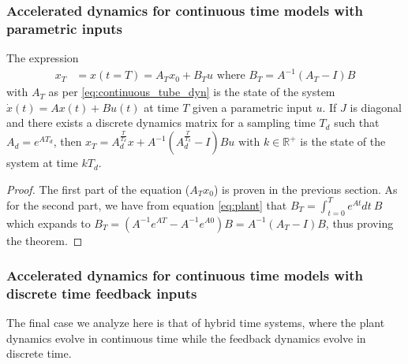 \documentclass[a4paper,UKenglish]{lipics-v2018}
\newcommand{\mat}[1]{{#1}}
\renewcommand{\vec}[1]{{#1}}
\begin{document}
 \subsubsection{Accelerated dynamics for continuous time models with parametric inputs}\label{sec:cont_acc_param_inputs}
\begin{lemma}
The expression
 \begin{align}
 \vec{x}_T&=\vec{x}(t=T)=\mat{A}_T\vec{x}_0 + \mat{B}_T\vec{u} \text{ where } \mat{B}_T=\mat{A}^{-1}(\mat{A}_T-\mat{I})\mat{B} 
 \label{eq:param_discretize}
 \end{align}
 with $\mat{A}_T$ as per \eqref{eq:continuous_tube_dyn} is the state of the system $\dot{\vec{x}}(t)=\mat{A}\vec{x}(t)+\mat{B}\vec{u}(t)$ at time $T$ given a parametric input $\vec{u}$.
 If $\mat{J}$ is diagonal and there exists a discrete dynamics matrix for a sampling time $T_d$ such that $A_d=e^{\mat{A} T_d}$, then $\vec{x}_T=A_d^{\frac{T}{T_d}}\vec{x}+\mat{A}^{-1}(\mat{A}_d^{\frac{T}{T_d}}-\mat{I})\mat{B}\vec{u} \text{ with } k \in \mathbb{R}^+$ is the state of the system at time $kT_d$.
 \end{lemma}
 \begin{proof}
 The first part of the equation ($\mat{A}_T\vec{x}_0$) is proven in the previous section.  As for the second part, we have from equation \eqref{eq:plant}
that $\mat{B}_T = \int_{t = 0}^{T} e^{\mat{A} t} dt\ \mat{B}$ which expands to $\mat{B}_T= (\mat{A}^{-1} e^{\mat{A}T}-\mat{A}^{-1} e^{\mat{A} 0}) \mat{B}=\mat{A}^{-1}(\mat{A}_T-\mat{I})\mat{B}$, thus proving the theorem.
 \end{proof}
  
 \subsubsection{Accelerated dynamics for continuous time models with discrete time feedback inputs}\label{asec:real_discrete_feedback_inputs}

The final case we analyze here is that of hybrid time systems, where the
plant dynamics evolve in continuous time while the feedback dynamics evolve
in discrete time.
\end{document}
